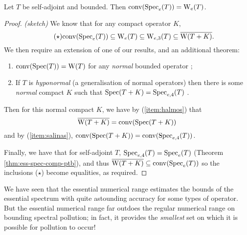 \documentclass[../main.tex]{subfiles}
\begin{document}
\begin{corollary}
  Let $T$ be self-adjoint and bounded. Then $\mathrm{conv}(\mathrm{Spec}_e(T)) = \mathrm{W}_e(T)$.
\end{corollary}
\begin{proof}\emph{(sketch)}
We know that for any compact operator $K$,
  \begin{equation*}
  \tag{$\star$}
  \label{eqn:inclusions}
  \mathrm{conv}(\mathrm{Spec}_e(T)) \subseteq \mathrm{W}_e(T) \subseteq \mathrm{W}_{e,3}(T) \subseteq \overline{\mathrm{W}(T+K)}.
  \end{equation*}
We then require an extension of one of our results, and an additional theorem:
  \begin{enumerate}
    \item\label{item:halmos} $\mathrm{conv}(\mathrm{Spec}(T)) = \mathrm{W}(T)$ for any \emph{normal} bounded operator \cite{halmos1982hilbert};
    \item\label{item:salinas} If $T$ is \emph{hyponormal} (a generalisation of normal operators) then there is some 
      \emph{normal} compact $K$ such that $\mathrm{Spec}(T+K) = \mathrm{Spec}_{e,4}(T)$ \cite{salinas1972operators}.
  \end{enumerate}

Then for this normal compact $K$, we have by (\ref{item:halmos}) that
  $$\overline{\mathrm{W}(T+K)} = \mathrm{conv}(\mathrm{Spec}(T+K))$$
  and by (\ref{item:salinas}), $\mathrm{conv}(\mathrm{Spec}(T+K)) = \mathrm{conv}(\mathrm{Spec}_{e,4}(T))$.

  Finally, we have that for self-adjoint $T$, $\mathrm{Spec}_{e,4}(T) = \mathrm{Spec}_e(T)$
  (Theorem \ref{thm:ess-spec-comp-ptb}), and
  thus $\overline{\mathrm{W}(T+K)} \subseteq \mathrm{conv}(\mathrm{Spec}_e(T))$
  so the inclusions ($\star$) become equalities, as required.
\end{proof}

We have seen that the essential numerical range estimates the bounds of the
essential spectrum with quite astounding accuracy for some types of operator.
But the essential numerical range far outdoes the regular numerical range on
bounding spectral pollution; in fact, it provides the \emph{smallest} set on which
it is possible for pollution to occur! 
\end{document}
